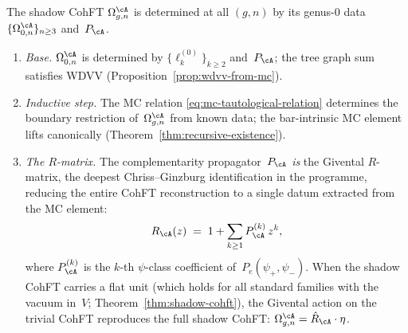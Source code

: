 \begin{theorem}
\label{thm:cohft-reconstruction}
\ClaimStatusProvedHere
{}
The shadow CohFT $\Omega_{g,n}^{\cA}$
is determined at all $(g,n)$ by its genus-$0$ data
$\{\Omega_{0,n}^{\cA}\}_{n \geq 3}$ and~$P_\cA$.
\begin{enumerate}[label=\textup{(\roman*)}]
\item \emph{Base.}
  $\Omega_{0,n}^{\cA}$ is determined by
  $\{\ell_k^{(0)}\}_{k \geq 2}$
  and~$P_\cA$; the tree graph sum satisfies WDVV
  \textup{(}Proposition~\textup{\ref{prop:wdvv-from-mc}}\textup{)}.

\item \emph{Inductive step.}
  The MC relation
  \eqref{eq:mc-tautological-relation} determines the
  boundary restriction of~$\Omega_{g,n}^{\cA}$ from
  known data; the bar-intrinsic MC element lifts canonically
  \textup{(}Theorem~\textup{\ref{thm:recursive-existence}}\textup{)}.

\item \emph{The $R$-matrix.}
  The complementarity propagator~$P_\cA$ \emph{is} the
  Givental $R$-matrix, the deepest Chriss--Ginzburg identification
  in the programme, reducing the entire CohFT reconstruction to
  a single datum extracted from the MC element:
  \begin{equation}\label{eq:r-matrix-propagator}
  R_\cA(z)
  \;=\;
  1 + \sum_{k \geq 1}
  P_\cA^{(k)}\, z^k,
  \end{equation}
  where $P_\cA^{(k)}$ is the $k$-th $\psi$-class coefficient
  of~$P_e(\psi_+, \psi_-)$.
  When the shadow CohFT carries a flat unit
  \textup{(}which holds for all standard families with the
  vacuum in~$V$; Theorem~\textup{\ref{thm:shadow-cohft})},
  the Givental action on the trivial CohFT
  reproduces the full shadow CohFT:
  $\Omega_{g,n}^{\cA} = \hat{R}_\cA \cdot \eta$.
\end{enumerate}
\end{theorem}

